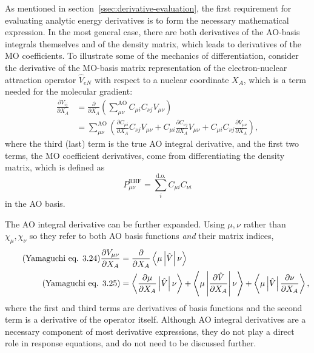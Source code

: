 \documentclass[%
class = book,%
crop = false,%
float = true,%
multi = true,%
preview = false,%
]{standalone}
\begin{document}
As mentioned in section~\ref{ssec:derivative-evaluation}, the first requirement for evaluating analytic energy derivatives is to form the necessary mathematical expression. In the most general case, there are both derivatives of the AO-basis integrals themselves and of the density matrix, which leads to derivatives of the MO coefficients. To illustrate some of the mechanics of differentiation, consider the derivative of the MO-basis matrix representation of the electron-nuclear attraction operator \(\hat{V}_{eN}\) with respect to a nuclear coordinate \(X_{A}\), which is a term needed for the molecular gradient:
\begin{align}
  \label{eq:yamaguchi-3.80}\tag{Yamaguchi eq. 3.80}
  \frac{\partial V_{ij}}{\partial X_{A}} &= \frac{\partial}{\partial X_{A}} \left( \sum_{\mu\nu}^{\text{AO}} C_{\mu i} C_{\nu j} V_{\mu\nu} \right) \\
  \label{3.81}\tag{Yamaguchi eq. 3.81}
                                         &= \sum_{\mu\nu}^{\text{AO}} \left( \frac{\partial C_{\mu i}}{\partial X_{A}} C_{\nu j} V_{\mu\nu} + C_{\mu i} \frac{\partial C_{\nu j}}{\partial X_{A}} V_{\mu\nu} + C_{\mu i} C_{\nu j} \frac{\partial V_{\mu\nu}}{\partial X_{A}} \right),
\end{align}
where the third (last) term is the true AO integral derivative, and the first two terms, the MO coefficient derivatives, come from differentiating the density matrix, which is defined as
\begin{equation}
  \label{eq:density-matrix}
  P_{\mu\nu}^{\text{RHF}} = \sum_{i}^{\text{d.o.}} C_{\mu i} C_{\nu i}
\end{equation}
in the AO basis.

The AO integral derivative can be further expanded. Using \(\mu,\nu\) rather than \(\chi_{\mu},\chi_{\nu}\) so they refer to both AO basis functions \emph{and} their matrix indices,
\begin{align}
  \tag{Yamaguchi eq. 3.24}
  \frac{\partial V_{\mu\nu}}{\partial X_{A}} &= \frac{\partial}{\partial X_{A}} \Braket{ \mu \left| \hat{V} \right| \nu } \\
  \label{3.25}\tag{Yamaguchi eq. 3.25}
                                             &= \Braket{ \frac{\partial \mu}{\partial X_{A}} \left| \hat{V} \right| \nu } + \Braket{ \mu \left| \frac{\partial \hat{V}}{\partial X_{A}} \right| \nu } + \Braket{ \mu \left| \hat{V} \right| \frac{\partial \nu}{\partial X_{A}} },
\end{align}
where the first and third terms are derivatives of basis functions and the second term is a derivative of the operator itself. Although AO integral derivatives are a necessary component of most derivative expressions, they do not play a direct role in response equations, and do not need to be discussed further.
\end{document}
